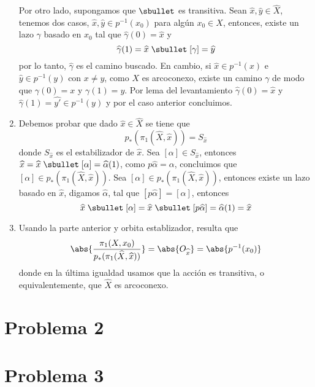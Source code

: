 \documentclass{article}
\begin{document}
\begin{enumerate}
    Por otro lado, supongamos que $\sbullet$ es transitiva. Sean 
    $\widehat{x},\widehat{y}\in\widehat{X}$, tenemos dos casos, 
    $\widehat{x},\widehat{y}\in p^{-1}(x_{0})$ para algún $x_{0}\in X$, entonces, existe un lazo 
    $\gamma$ basado en $x_{0}$ tal que $\widehat{\gamma}(0)=\widehat{x}$ y
    \begin{equation*}
        \widehat{\gamma}(1)=\widehat{x}\hspace{1mm}{\sbullet}\hspace{1mm}[\gamma]=\widehat{y}
    \end{equation*}
    por lo tanto, $\widehat{\gamma}$ es el camino buscado. En cambio, si 
    $\widehat{x}\in p^{-1}(x)$ e $\widehat{y}\in p^{-1}(y)$ con $x\neq y$, como $X$ es arcoconexo,
    existe un camino $\gamma$ de modo que $\gamma(0)=x$ y $\gamma(1)=y$. Por lema del 
    levantamiento $\widehat{\gamma}(0)=\widehat{x}$ y $\widehat{\gamma}(1)
    =\widehat{y'}\in p^{-1}(y)$ y por el caso anterior concluimos.
    
    \item Debemos probar que dado $\widehat{x}\in\widehat{X}$ se tiene que
    \begin{equation*}
        p_{*}(\pi_{1}(\widehat{X},\widehat{x}))=S_{\widehat{x}}
    \end{equation*}
    donde $S_{\widehat{x}}$ es el estabilizador de $\widehat{x}$. Sea 
    $[\alpha]\in S_{\widehat{x}}$, entonces $\widehat{x}
    =\widehat{x}\hspace{1mm}{\sbullet}\hspace{1mm}[\alpha]=\widehat{\alpha}(1)$, como 
    $p\widehat{\alpha}=\alpha$, concluimos que 
    $[\alpha]\in p_{*}(\pi_{1}(\widehat{X},\widehat{x}))$. Sea 
    $[\alpha]\in p_{*}(\pi_{1}(\widehat{X},\widehat{x}))$, entonces existe un lazo basado en 
    $\widehat{x}$, digamos $\widehat{\alpha}$, tal que $[p\widehat{\alpha}]=[\alpha]$, entonces
    \begin{equation*}
        \widehat{x}\hspace{1mm}{\sbullet}\hspace{1mm}[\alpha]
        =\widehat{x}\hspace{1mm}{\sbullet}\hspace{1mm}[p\widehat{\alpha}]=\widehat{\alpha}(1)
        =\widehat{x}
    \end{equation*}
    
    \item Usando la parte anterior y orbita establizador, resulta que
    \begin{equation*}
        \abs{\frac{\pi_{1}(X,x_{0})}{p_{*}(\pi_{1}(\widehat{X},\widehat{x}))}}
        =\abs{O_{\widehat{x}}}=\abs{p^{-1}(x_{0})}
    \end{equation*}
    donde en la última igualdad usamos que la acción es transitiva, o equivalentemente, que 
    $\widehat{X}$ es arcoconexo.
\end{enumerate}

\section*{Problema 2}

\section*{Problema 3}

\end{document}
